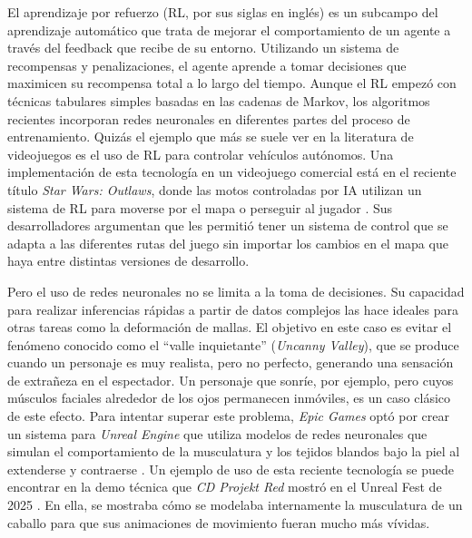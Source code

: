 El aprendizaje por refuerzo (RL, por sus siglas en inglés) es un subcampo del aprendizaje automático que trata de mejorar el comportamiento de un agente a través del feedback que recibe de su entorno. Utilizando un sistema de recompensas y penalizaciones, el agente aprende a tomar decisiones que maximicen su recompensa total a lo largo del tiempo. Aunque el RL empezó con técnicas tabulares simples basadas en las cadenas de Markov, los algoritmos recientes incorporan redes neuronales en diferentes partes del proceso \cite{ghasemi_comprehensive_2025} de entrenamiento. Quizás el ejemplo que más se suele ver en la literatura de videojuegos es el uso de RL para controlar vehículos autónomos. Una implementación de esta tecnología en un videojuego comercial está en el reciente título \textit{Star Wars: Outlaws}, donde las motos controladas por IA utilizan un sistema de RL para moverse por el mapa o perseguir al jugador \cite{gaudreau_game_2025}. Sus desarrolladores argumentan que les permitió tener un sistema de control que se adapta a las diferentes rutas del juego sin importar los cambios en el mapa que haya entre distintas versiones de desarrollo.

Pero el uso de redes neuronales no se limita a la toma de decisiones. Su capacidad para realizar inferencias rápidas a partir de datos complejos las hace ideales para otras tareas como la deformación de mallas. El objetivo en este caso es evitar el fenómeno conocido como el ``valle inquietante'' (\textit{Uncanny Valley}), que se produce cuando un personaje es muy realista, pero no perfecto, generando una sensación de extrañeza en el espectador. Un personaje que sonríe, por ejemplo, pero cuyos músculos faciales alrededor de los ojos permanecen inmóviles, es un caso clásico de este efecto. Para intentar superar este problema, \textit{Epic Games} optó por crear un sistema para \textit{Unreal Engine} que utiliza modelos de redes neuronales que simulan el comportamiento de la musculatura y los tejidos blandos bajo la piel al extenderse y contraerse \cite{epic_games_ml_2025}. Un ejemplo de uso de esta reciente tecnología se puede encontrar en la demo técnica que \textit{CD Projekt Red} mostró en el Unreal Fest de 2025 \cite{cd_projekt_red_witcher_2025}. En ella, se mostraba cómo se modelaba internamente la musculatura de un caballo para que sus animaciones de movimiento fueran mucho más vívidas.



